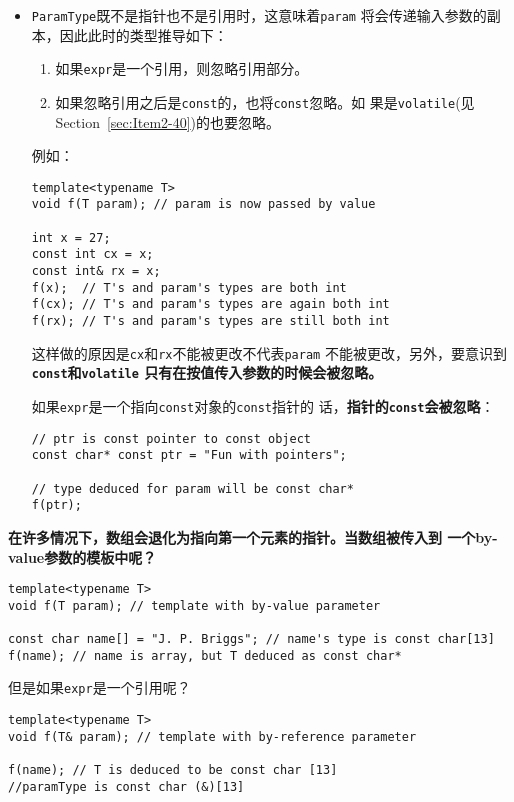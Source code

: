 \begin{itemize}
\item \texttt{ParamType}既不是指针也不是引用时，这意味着\texttt{param}
  将会传递输入参数的副本，因此此时的类型推导如下：
  \begin{enumerate}
  \item 如果\texttt{expr}是一个引用，则忽略引用部分。
  \item 如果忽略引用之后是\texttt{const}的，也将\texttt{const}忽略。如
    果是\texttt{volatile}(见Section~\ref{sec:Item2-40})的也要忽略。
  \end{enumerate}
  例如：
\begin{verbatim}
template<typename T>
void f(T param); // param is now passed by value

int x = 27;       
const int cx = x; 
const int& rx = x; 
f(x);  // T's and param's types are both int
f(cx); // T's and param's types are again both int
f(rx); // T's and param's types are still both int
\end{verbatim}
  这样做的原因是\texttt{cx}和\texttt{rx}不能被更改不代表\texttt{param}
  不能被更改，另外，要意识到\textbf{\texttt{const}和\texttt{volatile}
    只有在按值传入参数的时候会被忽略。}

  如果\texttt{expr}是一个指向\texttt{const}对象的\texttt{const}指针的
  话，\textbf{指针的\texttt{const}会被忽略}：
\begin{verbatim}
// ptr is const pointer to const object
const char* const ptr = "Fun with pointers";

// type deduced for param will be const char*
f(ptr);
\end{verbatim}
\end{itemize}

\textbf{在许多情况下，数组会退化为指向第一个元素的指针。当数组被传入到
  一个by-value参数的模板中呢？}

\begin{verbatim}
template<typename T>
void f(T param); // template with by-value parameter

const char name[] = "J. P. Briggs"; // name's type is const char[13]
f(name); // name is array, but T deduced as const char*
\end{verbatim}

但是如果\texttt{expr}是一个引用呢？

\begin{verbatim}
template<typename T>
void f(T& param); // template with by-reference parameter

f(name); // T is deduced to be const char [13]
//paramType is const char (&)[13]
\end{verbatim}

